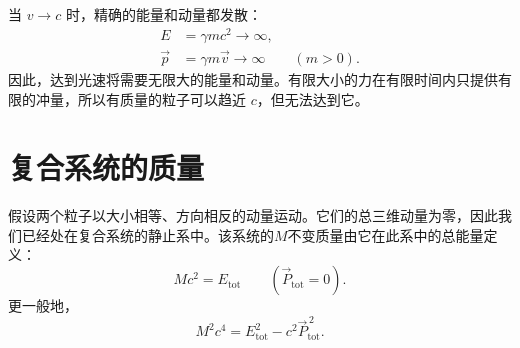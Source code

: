 \begin{classroomqa}
\end{classroomqa}

\begin{classroomqa}
\end{classroomqa}

当 \(v\to c\) 时，精确的能量和动量都发散：
\begin{equation}
\begin{aligned}
E&=\gamma mc^2\longrightarrow\infty,\\
\vec p&=\gamma m\vec v\longrightarrow\infty
\qquad(m>0).
\end{aligned}
\end{equation}
因此，达到光速将需要无限大的能量和动量。有限大小的力在有限时间内只提供有限的冲量，所以有质量的粒子可以趋近 \(c\)，但无法达到它。

\begin{classroomqa}
\end{classroomqa}

\section{复合系统的质量}

假设两个粒子以大小相等、方向相反的动量运动。它们的总三维动量为零，因此我们已经处在复合系统的静止系中。该系统的\(M\)不变质量由它在此系中的总能量定义：
\begin{equation}
Mc^2=E_{\mathrm{tot}}
\qquad
(\vec P_{\mathrm{tot}}=0).
\end{equation}
更一般地，
\begin{equation}
M^2c^4
=
E_{\mathrm{tot}}^2-c^2\vec P_{\mathrm{tot}}^{\,2}.
\label{eq:sr3-composite-mass}
\end{equation}

